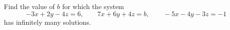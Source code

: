 Find the value of $b$ for which the system
\[-3x+2y-4z=6,\qquad 7x+6y+4z=b,\qquad -5x-4y-3z=-1\]
has infinitely many solutions.
